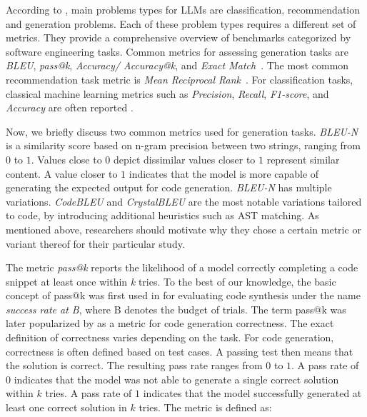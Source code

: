 According to \citet{10.1145/3695988}, main problems types for LLMs are classification, recommendation and generation problems.
Each of these problem types requires a different set of metrics.
They provide a comprehensive overview of benchmarks categorized by software engineering tasks.
Common metrics for assessing generation tasks are \emph{BLEU}, \emph{pass@k}, \emph{Accuracy/ Accuracy@k}, and \emph{Exact Match}~\cite{10.1145/3695988}.
The most common recommendation task metric is \emph{Mean Reciprocal Rank}~\cite{10.1145/3695988}.
For classification tasks, classical machine learning metrics such as \emph{Precision}, \emph{Recall}, \emph{F1-score}, and \emph{Accuracy} are often reported \cite{10.1145/3695988}.

Now, we briefly discuss two common metrics used for generation tasks.
\emph{BLEU-N} \cite{DBLP:conf/acl/PapineniRWZ02} is a similarity score based on n-gram precision between two strings, ranging from $0$ to $1$.
Values close to $0$ depict dissimilar values closer to $1$ represent similar content.
A value closer to $1$ indicates that the model is more capable of generating the expected output for code generation.
\emph{BLEU-N} has multiple variations.
\emph{CodeBLEU} \cite{DBLP:journals/corr/abs-2009-10297} and \emph{CrystalBLEU} \cite{DBLP:conf/kbse/EghbaliP22} are the most notable variations tailored to code, by introducing additional heuristics such as AST matching.
As mentioned above, researchers should motivate why they chose a certain metric or variant thereof for their particular study.

The metric \emph{pass@k} reports the likelihood of a model correctly completing a code snippet at least once within \emph{k} tries.
To the best of our knowledge, the basic concept of pass@k was first used in \cite{DBLP:journals/corr/abs-1906-04908} for evaluating code synthesis under the name \emph{success rate at B}, where B denotes the budget of trials.
The term pass@k was later popularized by \cite{DBLP:journals/corr/abs-2107-03374} as a metric for code generation correctness.
The exact definition of correctness varies depending on the task.
For code generation, correctness is often defined based on test cases. A passing test then means that the solution is correct.
The resulting pass rate ranges from $0$ to $1$.
A pass rate of $0$ indicates that the model was not able to generate a single correct solution within $k$ tries.
A pass rate of $1$ indicates that the model successfully generated at least one correct solution in $k$ tries.
The metric is defined as:

